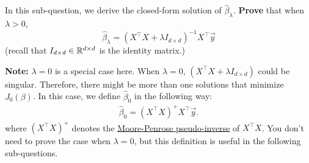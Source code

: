 \item {} In this sub-question, we derive the closed-form solution of $\hat{\beta}_\lambda.$ \textbf{Prove} that when $\lambda>0$, 
\begin{equation}
	\hat{\beta}_\lambda=(X^\top X+\lambda I_{d\times d})^{-1}X^\top \vec{y} \label{equ:sol}
\end{equation} (recall that $I_{d\times d}\in \mathbb{R}^{d\times d}$ is the identity matrix.)

\textbf{Note:} $\lambda=0$ is a special case here. When $\lambda=0$, $(X^\top X+\lambda I_{d\times d})$ could be singular. Therefore, there might be more than one solutions that minimize $J_0(\beta)$. In this case, we define $\hat{\beta}_0$ in the following way:
\begin{align}
	\hat{\beta}_0=(X^\top X)^{+}X^\top \vec{y}.
\end{align}
where $(X^\top X)^{+}$ denotes the \href{https://en.wikipedia.org/wiki/Moore-Penrose_inverse}{Moore-Penrose pseudo-inverse} of $X^\top X$. You don't need to prove the case when $\lambda=0$, but this definition is useful in the following sub-questions. 